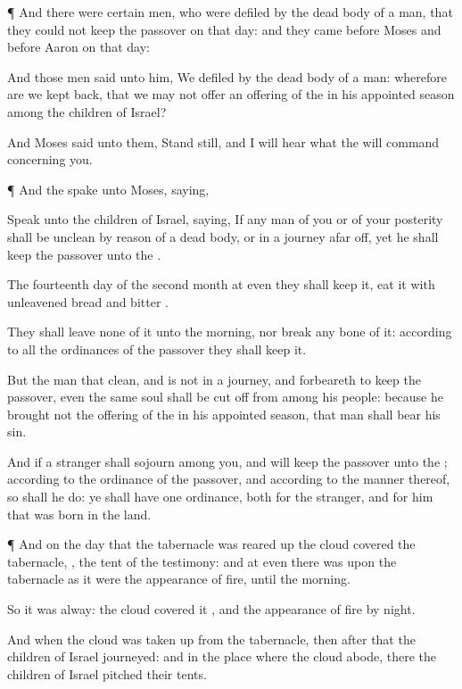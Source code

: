 {\par }{\PP {}¶ And there were certain
men, who were
defiled by the dead
body of a
man, that they
could not
keep the
passover on that
day: and they
came
before
Moses and
before
Aaron on that
day:

And
those
men
said unto him, We
{}
defiled by the dead
body of a
man: wherefore are we kept
back, that we may not
offer an
offering of the
{} in his appointed
season
among the
children of
Israel?

And
Moses
said unto them, Stand
still, and I will
hear what the
{} will
command concerning you.


\par }{\PP {}¶ And the
{}
spake unto
Moses,
saying,

Speak unto the
children of
Israel,
saying, If
any
man of you or of your
posterity shall be
unclean by reason of a dead
body, or
{} in a
journey afar
off, yet he shall
keep the
passover unto the
{}.

The
fourteenth
day of the
second
month at
even they shall
keep it,
{}
eat it with unleavened
bread and
bitter
{}.

They shall
leave none of it unto the
morning, nor
break any
bone of it: according to all the
ordinances of the
passover they shall
keep it.

But the
man that
{}
clean, and is not in a
journey, and
forbeareth to
keep the
passover, even the same
soul shall be cut
off from among his
people: because he
brought not the
offering of the
{} in his appointed
season, that
man shall
bear his
sin.

And if a
stranger shall
sojourn among you, and will
keep the
passover unto the
{}; according to the
ordinance of the
passover, and according to the
manner thereof, so shall he
do: ye shall have
one
ordinance, both for the
stranger, and for him that was
born in the
land.


\par }{\PP {}¶ And on the
day that the
tabernacle was reared
up the
cloud
covered the
tabernacle,
{}, the
tent of the
testimony: and at
even there was upon the
tabernacle as it were the
appearance of
fire, until the
morning.

So it was
alway: the
cloud
covered it
{}, and the
appearance of
fire by
night.

And
when the
cloud was taken
up from the
tabernacle, then
after that the
children of
Israel
journeyed: and in the
place where the
cloud
abode, there the
children of
Israel pitched their
tents.

}
